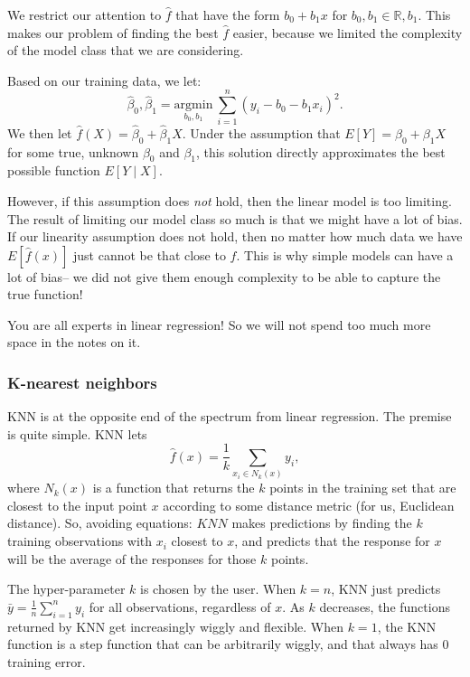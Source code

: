 We restrict our attention to $\hat{f}$ that have the form $b_0 + b_1 x$ for $b_0, b_1 \in \mathbb{R}, b_1$. This makes our problem of finding the best $\hat{f}$ easier, because we limited the complexity of the model class that we are considering.  

Based on our training data, we let: 
\begin{equation}
\label{ls}
\hat{\beta}_0, \hat{\beta}_1 = \underset{b_0, b_1}{\mathrm{argmin}} \ \sum_{i=1}^n (y_i - b_0 - b_1 x_i)^2.	
\end{equation}
We then let $\hat{f}(X) = \hat{\beta}_0 + \hat{\beta}_1 X$. Under the assumption that $E[Y] = \beta_0 + \beta_1 X$ for some true, unknown $\beta_0$ and $\beta_1$, this solution directly approximates the best possible function $E[Y \mid X]$. 

However, if this assumption does \emph{not} hold, then the linear model is too limiting. The result of limiting our model class so much is that we might have a lot of bias. If our linearity assumption does not hold, then no matter how much data we have $E[\hat{f}(x)]$ just cannot be that close to $f$. This is why simple models can have a lot of bias-- we did not give them enough complexity to be able to capture the true function!

You are all experts in linear regression! So we will not spend too much more space in the notes on it. 

\subsubsection{K-nearest neighbors}

KNN is at the opposite end of the spectrum from linear regression. The premise is quite simple. KNN lets
\begin{equation}
\hat{f}(x) = \frac{1}{k} \sum_{x_i \in N_k(x)} y_i,
\end{equation}
where $N_k(x)$ is a function that returns the $k$ points in the training set that are closest to the input point $x$ according to some distance metric (for us, Euclidean distance). So, avoiding equations: $KNN$ makes predictions by finding the $k$ training observations with $x_i$ closest to $x$, and predicts that the response for $x$ will be the average of the responses for those $k$ points. 

The hyper-parameter $k$ is chosen by the user. When $k=n$, KNN just predicts $\bar{y} = \frac{1}{n} \sum_{i=1}^n y_i$ for all observations, regardless of $x$. As $k$ decreases, the functions returned by KNN get increasingly wiggly and flexible. When $k=1$, the KNN function is a step function that can be arbitrarily wiggly, and that always has $0$ training error. 

